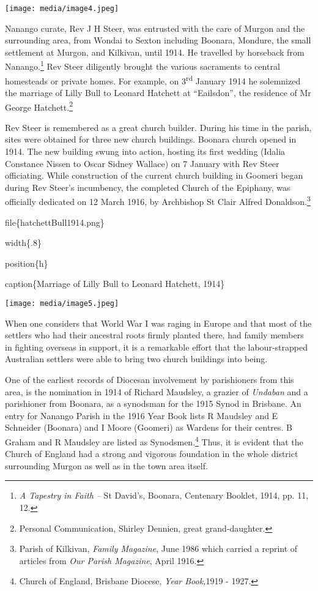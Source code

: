 \texttt{[image: media/image4.jpeg]}

Nanango curate, Rev J H Steer, was entrusted with the care of Murgon and
the surrounding area, from Wondai to Sexton including Boonara, Mondure,
the small settlement at Murgon, and Kilkivan, until 1914. He travelled
by horseback from Nanango.\footnote{\emph{A Tapestry in Faith --} St
  David's, Boonara, Centenary Booklet, 1914, pp. 11, 12.} Rev Steer
diligently brought the various sacraments to central homesteads or
private homes. For example, on 3\textsuperscript{rd} January 1914 he
solemnized the marriage of Lilly Bull to Leonard Hatchett at
``Eailsdon'', the residence of Mr George Hatchett.\footnote{Personal
  Communication, Shirley Dennien, great grand-daughter.}

Rev Steer is remembered as a great church builder. During his time in
the parish, sites were obtained for three new church buildings. Boonara
church opened in 1914. The new building swung into action, hosting its
first wedding (Idalia Constance Nissen to Oscar Sidney Wallace) on 7
January with Rev Steer officiating. While construction of the current
church building in Goomeri began during Rev Steer's incumbency, the
completed Church of the Epiphany, was officially dedicated on 12 March
1916, by Archbishop St Clair Alfred Donaldson.\footnote{Parish of
  Kilkivan, \emph{Family Magazine}, June 1986 which carried a reprint of
  articles from \emph{Our Parish Magazine}, April 1916.}

file\{hatchettBull1914.png\}

width\{.8\}

position\{h\}

caption\{Marriage of Lilly Bull to Leonard Hatchett, 1914\}

\texttt{[image: media/image5.jpeg]}

When one considers that World War I was raging in Europe and that most
of the settlers who had their ancestral roots firmly planted there, had
family members in fighting overseas in support, it is a remarkable
effort that the labour-strapped Australian settlers were able to bring
two church buildings into being.

One of the earliest records of Diocesan involvement by parishioners from
this area, is the nomination in 1914 of Richard Maudsley, a grazier of
\emph{Undaban} and a parishioner from Boonara, as a synodsman for the
1915 Synod in Brisbane. An entry for Nanango Parish in the 1916 Year
Book lists R Maudsley and E Schneider (Boonara) and I Moore (Goomeri) as
Wardens for their centres. B Graham and R Maudsley are listed as
Synodsmen.\footnote{Church of England, Brisbane Diocese, \emph{Year
  Book,}1919 - 1927.} Thus, it is evident that the Church of England had
a strong and vigorous foundation in the whole district surrounding
Murgon as well as in the town area itself.

